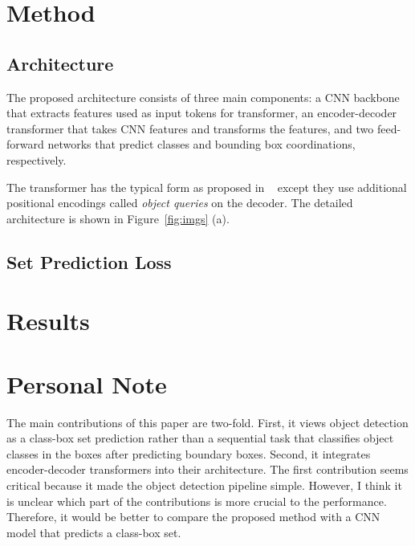 \documentclass[10pt,twocolumn,letterpaper]{article}
\begin{document}
\section{Method}
\subsection{Architecture}
The proposed architecture consists of three main components: a CNN backbone that extracts features used as input tokens for transformer, an encoder-decoder transformer that takes CNN features and transforms the features, and two feed-forward networks that predict classes and bounding box coordinations, respectively. 

The transformer has the typical form as proposed in ~\cite{} except they use additional positional encodings called \textit{object queries} on the decoder. The detailed architecture is shown in Figure~\ref{fig:imgs} (a). 

\subsection{Set Prediction Loss}


\section{Results}

\section{Personal Note}
The main contributions of this paper are two-fold. First, it views object detection as a class-box set prediction rather than a sequential task that classifies object classes in the boxes after predicting boundary boxes. Second, it integrates encoder-decoder transformers into their architecture. The first contribution seems critical because it made the object detection pipeline simple.
However, I think it is unclear which part of the contributions is more crucial to the performance. Therefore, it would be better to compare the proposed method with a CNN model that predicts a class-box set. 

{\small


}
\end{document}
